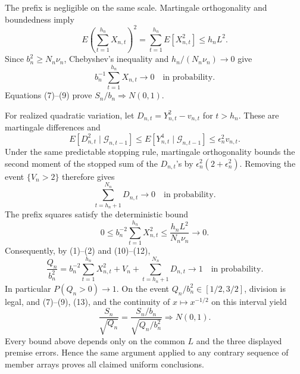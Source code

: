 The prefix is negligible on the same scale. Martingale orthogonality and boundedness imply
\[
 E\left(\sum_{t=1}^{h_n}X_{n,t}\right)^2
 =\sum_{t=1}^{h_n}E[X_{n,t}^2]\le h_nL^2.
\tag{8}
\]
Since \(b_n^2\ge N_n\nu_n\), Chebyshev's inequality and \(h_n/(N_n\nu_n)\to0\) give
\[
 b_n^{-1}\sum_{t=1}^{h_n}X_{n,t}\longrightarrow0
 \quad\text{in probability}.
\tag{9}
\]
Equations (7)--(9) prove \(S_n/b_n\Rightarrow N(0,1)\).

For realized quadratic variation, let \(D_{n,t}=Y_{n,t}^2-v_{n,t}\) for \(t>h_n\). These are martingale differences and
\[
 E[D_{n,t}^2\mid\mathcal G_{n,t-1}]
 \le E[Y_{n,t}^4\mid\mathcal G_{n,t-1}]
 \le\epsilon_n^2v_{n,t}.
\tag{10}
\]
Under the same predictable stopping rule, martingale orthogonality bounds the second moment of the stopped sum of the \(D_{n,t}\)'s by \(\epsilon_n^2(2+\epsilon_n^2)\). Removing the event \(\{V_n>2\}\) therefore gives
\[
 \sum_{t=h_n+1}^{N_n}D_{n,t}\longrightarrow0
 \quad\text{in probability}.
\tag{11}
\]
The prefix squares satisfy the deterministic bound
\[
 0\le b_n^{-2}\sum_{t=1}^{h_n}X_{n,t}^2
 \le\frac{h_nL^2}{N_n\nu_n}\longrightarrow0.
\tag{12}
\]
Consequently, by (1)--(2) and (10)--(12),
\[
 \frac{Q_n}{b_n^2}
 =b_n^{-2}\sum_{t=1}^{h_n}X_{n,t}^2+V_n
 +\sum_{t=h_n+1}^{N_n}D_{n,t}
 \longrightarrow1
 \quad\text{in probability}.
\tag{13}
\]
In particular \(P(Q_n>0)\to1\). On the event \(Q_n/b_n^2\in[1/2,3/2]\), division is legal, and (7)--(9), (13), and the continuity of \(x\mapsto x^{-1/2}\) on this interval yield
\[
 \frac{S_n}{\sqrt{Q_n}}
 =\frac{S_n/b_n}{\sqrt{Q_n/b_n^2}}\Rightarrow N(0,1).
\tag{14}
\]
Every bound above depends only on the common \(L\) and the three displayed premise errors. Hence the same argument applied to any contrary sequence of member arrays proves all claimed uniform conclusions.